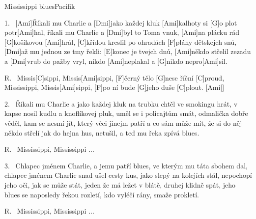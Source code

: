 \begin{song}{Mississippi blues}{Pacifik}


\begin{xverse}{1.~}
[\large Ami]{Ří}kali mu Charlie a [\large Dmi]jako každej kluk
[\large Ami]kalhoty si [\large G]o plot potr[\large Ami]hal,
říkali mu Charlie a [\large Dmi]byl to Toma vnuk,
[\large Ami]na plácku rád [\large G]košíkovou [\large Ami]hrál,
[\large C]křídou kreslil po ohradách [\large F]plány dětskejch snů,
[\large Dmi]až mu jednou ze tmy řekli: [\large E]konec je tvejch dnů,
[\large Ami]někdo střelil zezadu a [\large Dmi]vrub do pažby vryl,
nikdo [\large Ami]neplakal a [\large G]nikdo nepro[\large Ami]sil.
\end{xverse}


\begin{xverse}{R.~}
Missis[\large C]sippi, Missis[\large Ami]sippi, [\large F]{čer}ný tělo [\large G]nese říční [\large C]proud,
Mississippi, Missis[\large Ami]sippi, [\large F]po ní bude [\large G]jeho duše [\large C]plout. [\large Ami|]{}
\end{xverse}


\begin{xverse}{2.~}
Říkali mu Charlie a jako každej kluk
na trubku chtěl ve smokingu hrát,
v kapse nosil kudlu a knoflíkovej pluk,
uměl se i policajtům smát,
odmalička dobře věděl, kam se nesmí jít,
který věci jinejm patří a co sám může mít,
že si do něj někdo střelí jak do hejna hus,
netušil, a teď mu řeka zpívá blues.

\end{xverse}

\begin{xverse}{R.~}
Mississippi, Mississippi ...
\end{xverse}


\begin{xverse}{3.~}
Chlapec jménem Charlie, a jemu patří blues,
ve kterým mu táta sbohem dal,
chlapec jménem Charlie snad ušel cesty kus,
jako slepý na kolejích stál,
nepochopí jeho oči, jak se může stát,
jeden že má ležet v blátě, druhej klidně spát,
jeho blues se naposledy řekou rozletí,
kdo vyléčí rány, smaže prokletí.
\end{xverse}

\begin{xverse}{R.~}
Mississippi, Mississippi ...
\end{xverse}

\end{song}

